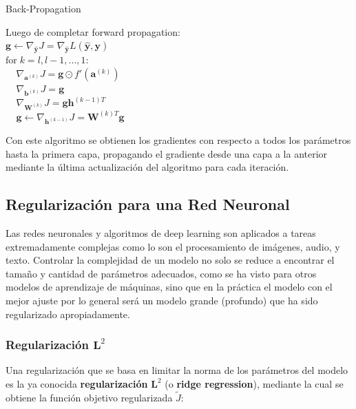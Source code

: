 \begin{algorithm}[H] %
\caption{Back-Propagation}\label{ML:Algorithm2}
Luego de completar forward propagation: \\
$\bm{g} \leftarrow \nabla_{\bm{\hat{y}}} J = \nabla_{\bm{\hat{y}}} L(\bm{\hat{y}},\bm{y})$\\
$\textrm{for} \;k = l,l-1,...,1:$\\
$\;\;\;\;\nabla_{\bm{a}^{(k)}} J = \bm{g}\odot f'(\bm{a}^{(k)})$\\
$\;\;\;\;\nabla_{\bm{b}^{(k)}} J = \bm{g}$\\
$\;\;\;\;\nabla_{\bm{W}^{(k)}} J = \bm{g}\bm{h}^{(k-1)T}$\\
$\;\;\;\;\bm{g} \leftarrow \nabla_{\bm{h}^{(k-1)}} J = \bm{W}^{(k)T}\bm{g}$
\end{algorithm}

Con este algoritmo se obtienen los gradientes con respecto a todos los par\'ametros hasta la primera capa, propagando el gradiente desde una capa a la anterior mediante la \'ultima actualizaci\'on del algoritmo para cada iteraci\'on.

\subsection{Regularizaci\'on para una Red Neuronal}

Las redes neuronales y algoritmos de deep learning son aplicados a tareas extremadamente complejas como lo son el procesamiento de im\'agenes, audio, y texto. Controlar la complejidad de un modelo no solo se reduce a encontrar el tamaño y cantidad de parámetros adecuados, como se ha visto para otros modelos de aprendizaje de m\'aquinas, sino que en la pr\'actica el modelo con el mejor ajuste por lo general ser\'a un modelo grande (profundo) que ha sido regularizado apropiadamente.%

\subsubsection{Regularizaci\'on $\bm{L}^{2}$}

Una regularizaci\'on que se basa en limitar la norma de los parámetros del modelo es la ya conocida \textbf{regularizaci\'on} $\bm{L}^{2}$ (o \textbf{ridge regression}), mediante la cual se obtiene la funci\'on objetivo regularizada $\tilde{J}$:

